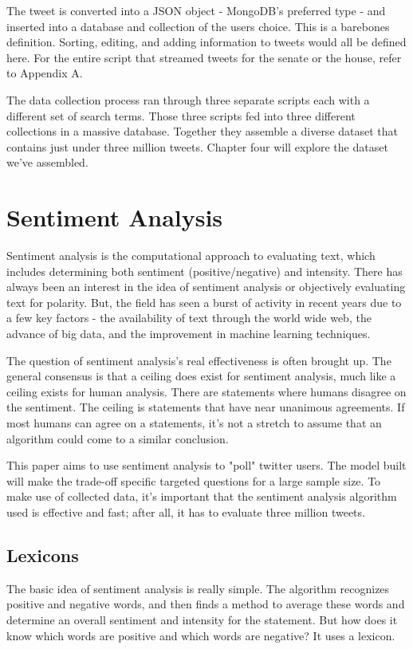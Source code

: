 \documentclass[11pt, twoside, reqno]{book}
\begin{document}
The tweet is converted into a JSON object - MongoDB's preferred type - and inserted into a database and collection of the users choice. This is a barebones definition. Sorting, editing, and adding information to tweets would all be defined here. For the entire script that streamed tweets for the senate or the house, refer to Appendix A.

The data collection process ran through three separate scripts each with a different set of search terms. Those three scripts fed into three different collections in a massive database. Together they assemble a diverse dataset that contains just under three million tweets. Chapter four will explore the dataset we've assembled. 

\chapter{Sentiment Analysis}
\label{ch:3}
\hspace{0.2in}Sentiment analysis is the computational approach to evaluating text, which includes determining both sentiment (positive/negative) and intensity. There has always been an interest in the idea of sentiment analysis or objectively evaluating text for polarity. But, the field has seen a burst of activity in recent years due to a few key factors - the availability of text through the world wide web, the advance of big data, and the improvement in machine learning techniques. 

The question of sentiment analysis's real effectiveness is often brought up. The general consensus is that a ceiling does exist for sentiment analysis, much like a ceiling exists for human analysis. There are statements where humans disagree on the sentiment. The ceiling is statements that have near unanimous agreements. If most humans can agree on a statements, it's not a stretch to assume that an algorithm could come to a similar conclusion. 

This paper aims to use sentiment analysis to "poll" twitter users. The model built will make the trade-off specific targeted questions for a large sample size. To make use of collected data, it's important that the sentiment analysis algorithm used is effective and fast; after all, it has to evaluate three million tweets. 

\section{Lexicons}
\hspace{0.2in}The basic idea of sentiment analysis is really simple. The algorithm recognizes positive and negative words, and then finds a method to average these words and determine an overall sentiment and intensity for the statement. But how does it know which words are positive and which words are negative? It uses a lexicon. 
\end{document}

